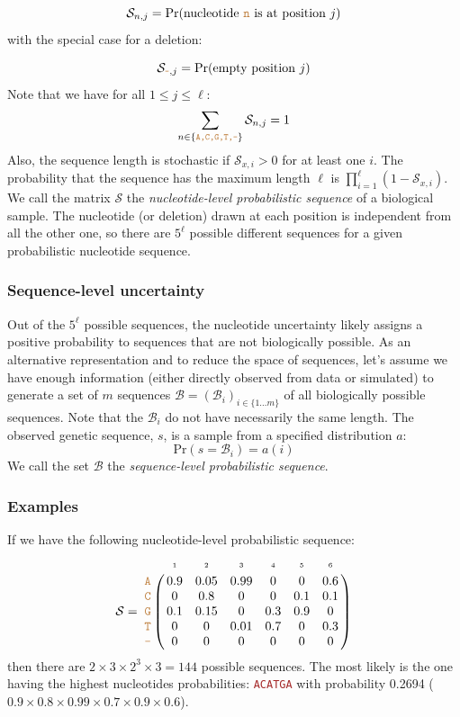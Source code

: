 \documentclass[10pt]{article}
\newcommand{\sq}[1]{\texttt{\textcolor{brown}{#1}}}
\newcommand{\pr}[1]{\mathrm{Pr}(#1)}
\newcommand{\sps}{\mathcal{B}} %
\newcommand{\nps}{\mathcal{S}} %
\newcommand{\nlps}{nucleotide-level probabilistic sequence\xspace}
\newcommand{\slps}{sequence-level probabilistic sequence\xspace}
\begin{document}
\begin{equation}
\nps_{n,j} = \pr{\text{nucleotide \sq{n} is at position }j}
\end{equation}
with the special case for a deletion:

\begin{equation}
\nps_{\sq{-},j} = \pr{\text{empty position }j}
\end{equation}
Note that we have for all $1\leq j \leq \ell$:
\begin{equation}
\sum_{n\in \{ \sq{A,C,G,T,-} \} } \nps_{n, j} = 1
\end{equation}
Also, the sequence length is stochastic if $\nps_{x,i}>0$ for at least one $i$. The probability that the sequence has the maximum length $\ell$ is $\prod_{i=1}^\ell (1-\nps_{x,i})$. 
We call the matrix $\nps$ the \emph{\nlps} of a biological sample.
The nucleotide (or deletion) drawn at each position is independent from all the other one, so there are $5^\ell$ possible different sequences for a given probabilistic nucleotide sequence. 



\subsubsection{Sequence-level uncertainty}

Out of the $5^\ell$ possible sequences, the nucleotide uncertainty likely assigns a positive probability to sequences that are not biologically possible.
As an alternative representation and to reduce the space of sequences, let's assume we have enough information (either directly observed from data or simulated) to generate a set of $m$ sequences $\sps = (\sps_i)_{i\in\{1\ldots m\} }$ of all biologically possible sequences. Note that the $\sps_i$ do not have necessarily the same length. 
The observed genetic sequence, $s$, is a sample from a specified distribution $a$:
\begin{equation}
\pr{s = \sps_i} = a(i)
\end{equation}
We call the set $\sps$ the \emph{\slps}.




\subsubsection{Examples}

If we have the following \nlps:
$$
\nps = 
\bordermatrix{
& \scriptscriptstyle{1} & \scriptscriptstyle{2}& \scriptscriptstyle{3}& \scriptscriptstyle{4} & \scriptscriptstyle{5} & \scriptscriptstyle{6} \cr
\sq{A} & 0.9 & 0.05   & 0.99 & 0 & 0 & 0.6\cr
\sq{C} & 0   & 0.8 & 0 & 0 & 0.1 & 0.1\cr
\sq{G} & 0.1 & 0.15 & 0 & 0.3 & 0.9 & 0\cr
\sq{T} & 0 & 0 & 0.01 & 0.7 & 0 & 0.3\cr
\sq{-} & 0 & 0 & 0 & 0 & 0 & 0\cr
}
$$
then there are $2\times 3 \times 2^3 \times 3 = 144$ possible sequences. The most likely is the one having the highest nucleotides probabilities: \sq{ACATGA} with probability 0.2694  ($0.9\times 0.8\times 0.99 \times 0.7 \times 0.9 \times 0.6$).
\end{document}
